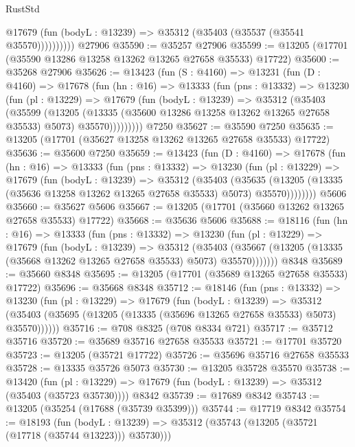 \begin{lexlean}{RustStd}
\begin{coremodule}
              @17679 (fun (bodyL : @13239) => @35312 (@35403 (@35537 (@35541 @35570))))))))))
    @27906
@35590 := @35257 @27906
@35599 := @13205 (@17701 (@35590 @13286 @13258 @13262 @13265 @27658 @35533) @17722)
@35600 := @35268 @27906
@35626 := @13423
    (fun (S : @4160) =>
    @13231
      (fun (D : @4160) =>
      @17678
        (fun (hn : @16) =>
        @13333
          (fun (pns : @13332) =>
          @13230
            (fun (pl : @13229) =>
            @17679
              (fun (bodyL : @13239) =>
              @35312
                (@35403
                  (@35599
                    (@13205
                      (@13335 (@35600 @13286 @13258 @13262 @13265 @27658 @35533) @5073)
                      @35570)))))))))
    @7250
@35627 := @35590 @7250
@35635 := @13205 (@17701 (@35627 @13258 @13262 @13265 @27658 @35533) @17722)
@35636 := @35600 @7250
@35659 := @13423
    (fun (D : @4160) =>
    @17678
      (fun (hn : @16) =>
      @13333
        (fun (pns : @13332) =>
        @13230
          (fun (pl : @13229) =>
          @17679
            (fun (bodyL : @13239) =>
            @35312
              (@35403
                (@35635
                  (@13205 (@13335 (@35636 @13258 @13262 @13265 @27658 @35533) @5073) @35570))))))))
    @5606
@35660 := @35627 @5606
@35667 := @13205 (@17701 (@35660 @13262 @13265 @27658 @35533) @17722)
@35668 := @35636 @5606
@35688 := @18116
    (fun (hn : @16) =>
    @13333
      (fun (pns : @13332) =>
      @13230
        (fun (pl : @13229) =>
        @17679
          (fun (bodyL : @13239) =>
          @35312
            (@35403
              (@35667 (@13205 (@13335 (@35668 @13262 @13265 @27658 @35533) @5073) @35570)))))))
    @8348
@35689 := @35660 @8348
@35695 := @13205 (@17701 (@35689 @13265 @27658 @35533) @17722)
@35696 := @35668 @8348
@35712 := @18146
    (fun (pns : @13332) =>
    @13230
      (fun (pl : @13229) =>
      @17679
        (fun (bodyL : @13239) =>
        @35312 (@35403 (@35695 (@13205 (@13335 (@35696 @13265 @27658 @35533) @5073) @35570))))))
@35716 := @708 @8325 (@708 @8334 @721)
@35717 := @35712 @35716
@35720 := @35689 @35716 @27658 @35533
@35721 := @17701 @35720
@35723 := @13205 (@35721 @17722)
@35726 := @35696 @35716 @27658 @35533
@35728 := @13335 @35726 @5073
@35730 := @13205 @35728 @35570
@35738 := @13420
    (fun (pl : @13229) => @17679 (fun (bodyL : @13239) => @35312 (@35403 (@35723 @35730))))
    @8342
@35739 := @17689 @8342
@35743 := @13205 (@35254 (@17688 (@35739 @35399)))
@35744 := @17719 @8342
@35754 := @18193
    (fun (bodyL : @13239) => @35312 (@35743 (@13205 (@35721 (@17718 (@35744 @13223))) @35730)))

\end{coremodule}
\end{lexlean}
